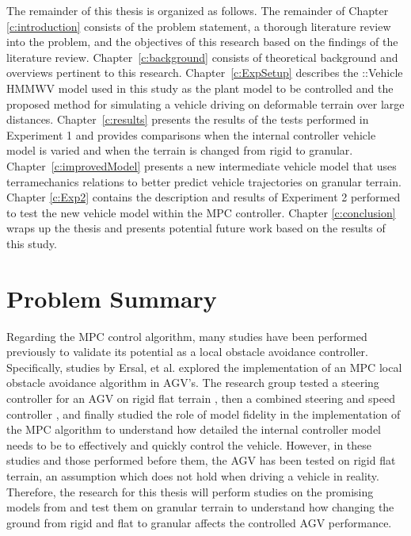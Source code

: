 \documentclass[12pt,onecolumn]{report}
\newcommand{\ChronoVehicle}{{\sffamily{Chrono}}::Vehicle}
\begin{document}
The remainder of this thesis is organized as follows. The remainder of Chapter \ref{c:introduction} consists of the problem statement, a thorough literature review into the problem, and the objectives of this research based on the findings of the literature review. Chapter~\ref{c:background} consists of theoretical background and overviews pertinent to this research. Chapter~\ref{c:ExpSetup} describes the {\ChronoVehicle} HMMWV model used in this study as the plant model to be controlled and the proposed method for simulating a vehicle driving on deformable terrain over large distances. Chapter~\ref{c:results} presents the results of the tests performed in Experiment 1 and provides comparisons when the internal controller vehicle model is varied and when the terrain is changed from rigid to granular. Chapter~\ref{c:improvedModel} presents a new intermediate vehicle model that uses terramechanics relations to better predict vehicle trajectories on granular terrain. Chapter \ref{c:Exp2} contains the description and results of Experiment 2 performed to test the new vehicle model within the MPC controller. Chapter \ref{c:conclusion} wraps up the thesis and presents potential future work based on the results of this study.


\section{Problem Summary}\label{s:ProblemSummary}

Regarding the MPC control algorithm, many studies have been performed previously to validate its potential as a local obstacle avoidance controller. Specifically, studies by Ersal, et al. explored the implementation of an MPC local obstacle avoidance algorithm in AGV’s. The research group tested a steering controller for an AGV on rigid flat terrain \cite{ModelFidelity2013}, then a combined steering and speed controller \cite{SpeedSteer2015}, and finally studied the role of model fidelity in the implementation of the MPC algorithm \cite{ModelFidelity2016} to understand how detailed the internal controller model needs to be to effectively and quickly control the vehicle. However, in these studies and those performed before them, the AGV has been tested on rigid flat terrain, an assumption which does not hold when driving a vehicle in reality. Therefore, the research for this thesis will perform  studies on the promising models from \cite{ModelFidelity2016} and test them on granular terrain to understand how changing the ground from rigid and flat to granular affects the controlled AGV performance.
\end{document}
